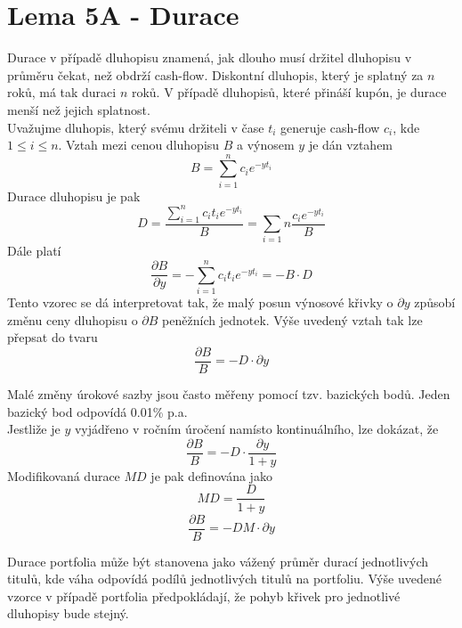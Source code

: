 \documentclass[a4paper]{book}
\begin{document}
\section {Lema 5A - Durace}

Durace v případě dluhopisu znamená, jak dlouho musí držitel dluhopisu v průměru čekat, než obdrží cash-flow. Diskontní dluhopis, který je splatný za $n$ roků, má tak duraci $n$ roků. V případě dluhopisů, které přináší kupón, je durace menší než jejich splatnost.\\
Uvažujme dluhopis, který svému držiteli v čase $t_i$ generuje cash-flow $c_i$, kde $1 \le i \le n$. Vztah mezi cenou dluhopisu $B$ a výnosem $y$ je dán vztahem
\begin{equation*}
B = \sum_{i=1}^{n} c_i e^{-y t_i}
\end{equation*}
Durace dluhopisu je pak
\begin{equation*}
D = \frac{\sum_{i=1}^{n} c_i t_i e^{-y t_i}}{B} = \sum_{i = 1}{n} \frac{c_i e^{-y t_i}}{B}
\end{equation*}
Dále platí
\begin{equation*}
\frac {\partial B}{\partial y} = - \sum_{i = 1}^{n} c_i t_i e^{-y t_i} = -B \cdot D
\end{equation*}
Tento vzorec se dá interpretovat tak, že malý posun výnosové křivky o $\partial y$ způsobí změnu ceny dluhopisu o $\partial B$ peněžních jednotek. Výše uvedený vztah tak lze přepsat do tvaru
\begin{equation*}
\frac{\partial B}{B} = -D \cdot \partial y
\end{equation*}

Malé změny úrokové sazby jsou často měřeny pomocí tzv. bazických bodů. Jeden bazický bod odpovídá 0.01\% p.a.\\

Jestliže je $y$ vyjádřeno v ročním úročení namísto kontinuálního, lze dokázat, že
\begin{equation*}
\frac {\partial B}{B} = -D \cdot \frac {\partial y}{1 + y}
\end{equation*}
Modifikovaná durace $MD$ je pak definována jako
\begin{equation*}
MD = \frac {D}{1 + y}
\end{equation*}
\begin{equation*}
\frac{\partial B}{B} = -DM \cdot \partial y
\end{equation*}

Durace portfolia může být stanovena jako vážený průměr durací jednotlivých titulů, kde váha odpovídá podílů jednotlivých titulů na portfoliu. Výše uvedené vzorce v případě portfolia předpokládají, že pohyb křivek pro jednotlivé dluhopisy bude stejný.
\end{document}
